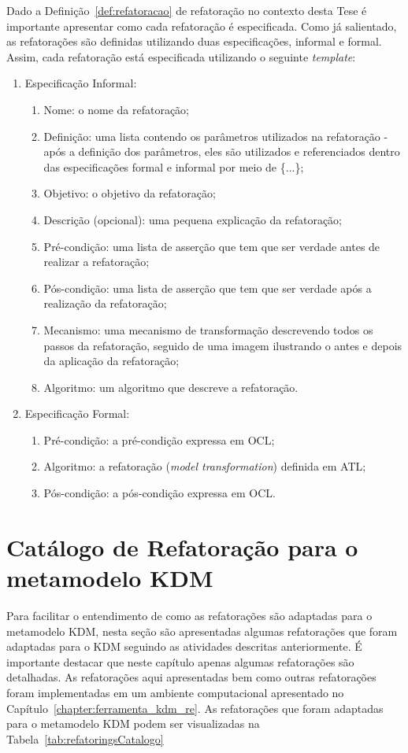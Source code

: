 Dado a Definição~\ref{def:refatoracao} de refatoração no contexto desta Tese é importante apresentar como cada refatoração é especificada. Como já salientado, as refatorações são definidas utilizando duas especificações, informal e formal. Assim, cada refatoração está especificada utilizando o seguinte \textit{template}:

\begin{enumerate}
	\item Especificação Informal:
		\begin{enumerate}
			\item Nome: o nome da refatoração;
			\item Definição: uma lista contendo os parâmetros utilizados na refatoração - após a definição dos parâmetros, eles são utilizados e referenciados dentro das especificações formal e informal por meio de \{...\};
			\item Objetivo: o objetivo da refatoração;
			\item Descrição (opcional): uma pequena explicação da refatoração;
			\item Pré-condição: uma lista de asserção que tem que ser verdade antes de realizar a refatoração;
			\item Pós-condição: uma lista de asserção que tem que ser verdade após a realização da refatoração;
			\item Mecanismo: uma mecanismo de transformação descrevendo todos os passos da refatoração, seguido de uma imagem ilustrando o antes e depois da aplicação da refatoração;
			\item Algoritmo: um algoritmo que descreve a refatoração.
		\end{enumerate}
	\item Especificação Formal:
		\begin{enumerate}
			\item Pré-condição: a pré-condição expressa em OCL;
			\item Algoritmo: a refatoração (\textit{model transformation}) definida em ATL;
			\item Pós-condição: a pós-condição expressa em OCL.
		\end{enumerate}
\end{enumerate}


\section{Catálogo de Refatoração para o metamodelo KDM}

Para facilitar o entendimento de como as refatorações são adaptadas para o metamodelo KDM, nesta seção são apresentadas algumas refatorações que foram adaptadas para o KDM seguindo as atividades descritas anteriormente. É importante destacar que neste capítulo apenas algumas refatorações são detalhadas. As refatorações aqui apresentadas bem como outras refatorações foram implementadas em um ambiente computacional apresentado no Capítulo~\ref{chapter:ferramenta_kdm_re}. As refatorações que foram adaptadas para o metamodelo KDM podem ser visualizadas na Tabela~\ref{tab:refatoringsCatalogo}

